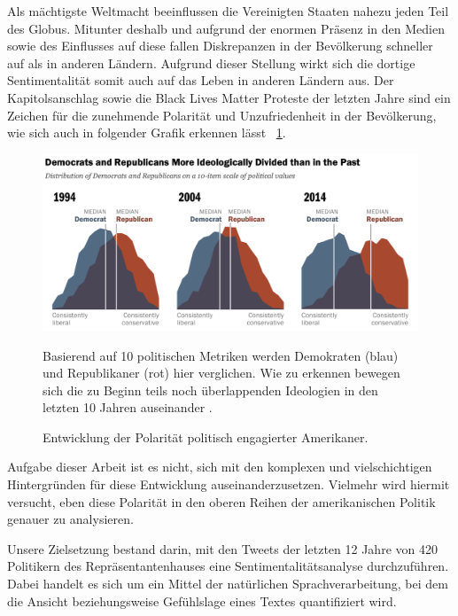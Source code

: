 Als mächtigste Weltmacht beeinflussen die Vereinigten Staaten nahezu jeden Teil des Globus. Mitunter deshalb und aufgrund der enormen Präsenz in den Medien sowie des Einflusses auf diese fallen Diskrepanzen in der Bevölkerung schneller auf als in anderen Ländern. Aufgrund dieser Stellung wirkt sich die dortige Sentimentalität somit auch auf das Leben in anderen Ländern aus. Der Kapitolsanschlag sowie die Black Lives Matter Proteste der letzten Jahre sind ein Zeichen für die zunehmende Polarität und Unzufriedenheit in der Bevölkerung, wie sich auch in folgender Grafik erkennen lässt ~\ref{fig:polPolar22}.

\begin{figure}[ht]
	\centering
	\includegraphics[width=1\textwidth]{images/Kapitel1/PoliticalPolarization}
	\caption{\label{fig:polPolar22}Entwicklung der Polarität politisch engagierter Amerikaner.}{Basierend auf 10 politischen Metriken werden Demokraten (blau) und Republikaner (rot) hier verglichen. Wie zu erkennen bewegen sich die zu Beginn teils noch überlappenden Ideologien in den letzten 10 Jahren auseinander \protect{}.}
\end{figure}

Aufgabe dieser Arbeit ist es nicht, sich mit den komplexen und vielschichtigen Hintergründen für diese Entwicklung auseinanderzusetzen. Vielmehr wird hiermit versucht, eben diese Polarität in den oberen Reihen der amerikanischen Politik genauer zu analysieren.

Unsere Zielsetzung bestand darin, mit den Tweets der letzten 12 Jahre von 420 Politikern des Repräsentantenhauses eine Sentimentalitätsanalyse durchzuführen. Dabei handelt es sich um ein Mittel der natürlichen Sprachverarbeitung, bei dem die Ansicht beziehungsweise Gefühlslage eines Textes quantifiziert wird.